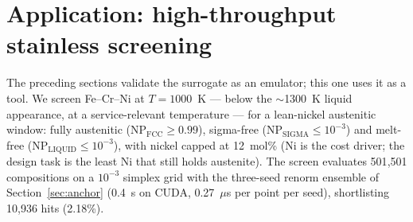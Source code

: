 \documentclass[preprint,12pt,authoryear]{elsarticle}
\begin{document}
\begin{table}[htbp]
\centering
\caption{Region-matched band reanalysis: holdout mean MAE on band rows divided
by in-distribution mean MAE on the identical rows (ratio of means; per-seed
ratios in parentheses), for the renorm MLP, the random forest
and XGBoost. Complements the random-control penalties of
Table~\ref{tab:holdout}; see Section~\ref{sec:protocols} for the two
references. The Fe--Cr--Ni temperature ordering reverses relative to the
random-control picture; the Fe--Mn--Ni temperature per-seed spread
(0.86/20.28/0.62) comes from a near-zero denominator on one seed and is
downweighted in the headline ratio. Panel B repeats the comparison in
ideal form: identical test rows and equal training size (band rows kept
in training, an equal number of random non-band rows dropped instead),
reporting the band-in/band-out ratio $H/I$ with the training-size
effect $I/\mathrm{main}$ in parentheses.}
\label{tab:region}
\small

\end{table}

\section{Application: high-throughput stainless screening}
\label{sec:screen}

The preceding sections validate the surrogate as an emulator; this one
uses it as a tool. We screen Fe--Cr--Ni at $T = 1000$~K --- below the
$\sim$1300~K liquid appearance, at a service-relevant temperature --- for
a lean-nickel austenitic window: fully austenitic
(NP$_{\mathrm{FCC}} \ge 0.99$), sigma-free
(NP$_{\mathrm{SIGMA}} \le 10^{-3}$) and melt-free
(NP$_{\mathrm{LIQUID}} \le 10^{-3}$), with nickel capped at 12~mol\%
(Ni is the cost driver; the design task is the least Ni that still holds
austenite). The screen evaluates 501{,}501 compositions on a
$10^{-3}$ simplex grid with the three-seed renorm ensemble of
Section~\ref{sec:anchor} (0.4~s on CUDA, 0.27~$\mu$s per point per seed),
shortlisting 10{,}936 hits (2.18\%).
\end{document}
